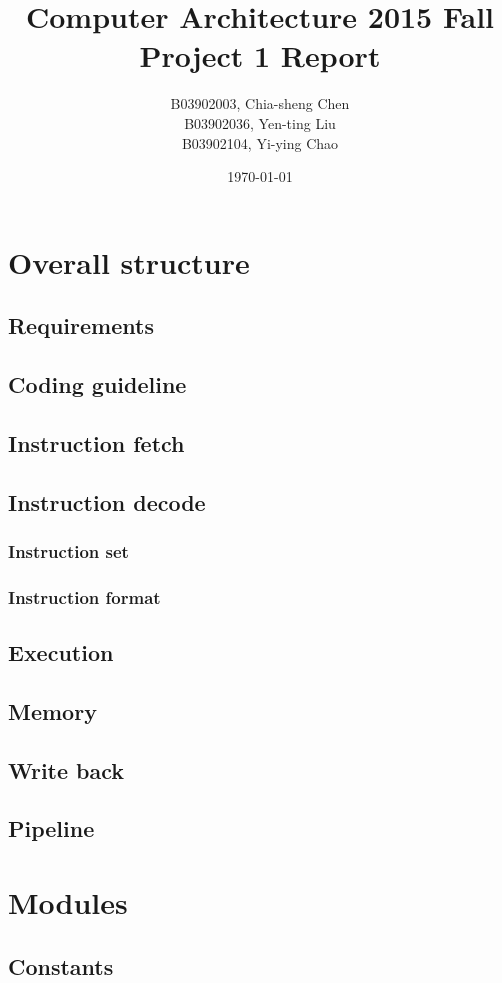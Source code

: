 \documentclass[11pt, a4paper, twoside]{IEEEtran}
\title{Computer Architecture 2015 Fall\\ Project 1 Report}
\author{B03902003, Chia-sheng Chen\\
		B03902036, Yen-ting Liu\\
		B03902104, Yi-ying Chao}
\date{\today}
\begin{document}
\maketitle
\section{Overall structure}
	\subsection{Requirements}
	\subsection{Coding guideline}
	\subsection{Instruction fetch}
	\subsection{Instruction decode}
		\subsubsection{Instruction set}
		\subsubsection{Instruction format}
	\subsection{Execution}
	\subsection{Memory}
	\subsection{Write back}
	\subsection{Pipeline}
\section{Modules}
	\subsection{Constants}
\end{document}
